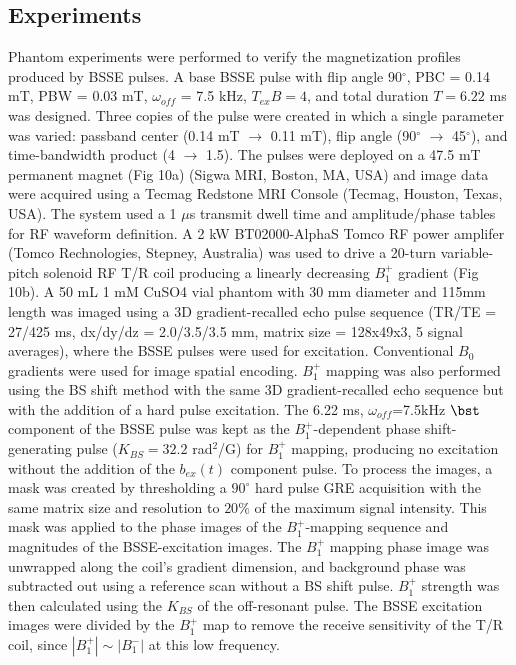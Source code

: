 \documentclass[a4paper,12pt]{article}
\newcommand{\bext}{b_{ex}(t)}
\begin{document}
\subsection*{Experiments}
Phantom experiments were performed to verify the magnetization profiles produced by BSSE pulses. 
A base BSSE pulse with flip angle 90$^\circ$, PBC = 0.14 mT, PBW = 0.03 mT,
$\omega_{off}$ = 7.5 kHz, $T_{ex}B=4$, 
and total duration $T=6.22$ ms was designed. 
Three copies of the pulse were created in which a single parameter was varied: 
passband center (0.14 mT $\rightarrow$ 0.11 mT), 
flip angle (90$^\circ$ $\rightarrow$ 45$^\circ$), 
and time-bandwidth product (4 $\rightarrow$ 1.5). 
The pulses were deployed on a 47.5 mT permanent magnet (Fig 10a) (Sigwa MRI, Boston, MA, USA) and image data were 
acquired using a Tecmag Redstone MRI Console (Tecmag, Houston, Texas, USA). 
The system used a 1 $\mu$s transmit dwell time 
and amplitude/phase tables for RF waveform definition.
A 2 kW BT02000-AlphaS Tomco RF power amplifer (Tomco Rechnologies, Stepney, Australia) was used to drive a 20-turn variable-pitch solenoid RF T/R coil producing a linearly decreasing $B_1^+$ gradient (Fig 10b). 
A 50 mL 1 mM CuSO4 vial phantom with 30 mm diameter and 115mm length was imaged using a 3D gradient-recalled echo pulse sequence (TR/TE = 27/425 ms, dx/dy/dz = 2.0/3.5/3.5 mm, matrix size = 128x49x3, 5 signal averages),
where the BSSE pulses were used for excitation. 
Conventional $B_0$ gradients were used for image spatial encoding. 
$B_1^+$ mapping was also performed using the BS shift method \cite{Sacolick2010B1Shift}
with the same 3D gradient-recalled echo sequence but 
with the addition of a hard pulse excitation. 
The 6.22 ms, $\omega_{off}$=7.5kHz $\bst$ component of the BSSE pulse was kept as the $B_1^+$-dependent phase shift-generating pulse ($K_{BS}=32.2$ rad$^2$/G) 
for $B_1^+$ mapping, producing no excitation without the addition of the $\bext$ component pulse.
To process the images, a mask was created by thresholding a $90^\circ$ hard pulse GRE acquisition with the same matrix size and resolution to $20\%$ of the maximum signal intensity. 
This mask was applied to the phase images of the $B_1^+$-mapping sequence and magnitudes of the BSSE-excitation images. 
The $B_1^+$ mapping phase image was unwrapped along the coil's gradient dimension, 
and background phase was subtracted out using a reference scan without a BS shift pulse. 
$B_1^+$ strength was then calculated using the $K_{BS}$ of the off-resonant pulse. 
The BSSE excitation images were divided by the $B_1^+$ map to remove the receive sensitivity of the T/R coil,
since $|B_1^+| \sim |B_1^-|$ at this low frequency.
\end{document}
